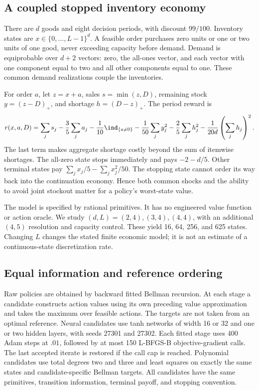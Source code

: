 \subsection{A coupled stopped inventory economy}
There are $d$ goods and eight decision periods, with discount $99/100$. Inventory states are $x\in\{0,\ldots,L-1\}^d$. A feasible order purchases zero units or one or two units of one good, never exceeding capacity before demand. Demand is equiprobable over $d+2$ vectors: zero, the all-ones vector, and each vector with one component equal to two and all other components equal to one. These common demand realizations couple the inventories.

For order $a$, let $z=x+a$, sales $s=\min(z,D)$, remaining stock $y=(z-D)_+$, and shortage $h=(D-z)_+$. The period reward is
\begin{equation}\label{eq:inventoryreward28}
 r(x,a,D)=\sum_j s_j-\frac35\sum_j a_j-\frac1{10}\ind_{\{a\ne0\}}
 -\frac1{50}\sum_j y_j^2-\frac25\sum_j h_j^2
 -\frac1{20d}\left(\sum_jh_j\right)^2.
\end{equation}
The last term makes aggregate shortage costly beyond the sum of itemwise shortages. The all-zero state stops immediately and pays $-2-d/5$. Other terminal states pay $\sum_jx_j/5-\sum_jx_j^2/50$. The stopping state cannot order its way back into the continuation economy. Hence both common shocks and the ability to avoid joint stockout matter for a policy's worst-state value.

The model is specified by rational primitives. It has no engineered value function or action oracle. We study $(d,L)=(2,4),(3,4),(4,4)$, with an additional $(4,5)$ resolution and capacity control. These yield 16, 64, 256, and 625 states. Changing $L$ changes the stated finite economic model; it is not an estimate of a continuous-state discretization rate.

\subsection{Equal information and reference ordering}
Raw policies are obtained by backward fitted Bellman recursion. At each stage a candidate constructs action values using its own preceding value approximation and takes the maximum over feasible actions. The targets are not taken from an optimal reference. Neural candidates use tanh networks of width 16 or 32 and one or two hidden layers, with seeds 27301 and 27302. Each fitted stage uses 400 Adam steps at $.01$, followed by at most 150 L-BFGS-B objective-gradient calls. The last accepted iterate is restored if the call cap is reached. Polynomial candidates use total degrees two and three and least squares on exactly the same states and candidate-specific Bellman targets. All candidates have the same primitives, transition information, terminal payoff, and stopping convention.

